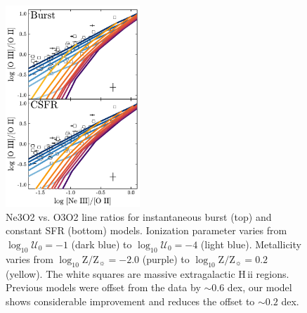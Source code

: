 \documentclass[linenumbers, trackchanges, tighten]{aastex61}%
\newcommand{\logten}{\ensuremath{\log_{10}}}
\newcommand{\hii}{H\,{\sc ii}\xspace}
\newcommand{\logZeq}[1]{\ensuremath{\logten \mathrm{Z}/\mathrm{Z}_{\sun} = #1}}
\newcommand{\logU}{\ensuremath{\logten \mathcal{U}_0}}
\begin{document}
\begin{figure}[!htbp]
  \begin{centering}
    \includegraphics[width=0.45\textwidth]{f20.pdf}
    \caption{Ne3O2 vs. O3O2 line ratios for instantaneous burst (top) and constant SFR (bottom) models. Ionization parameter varies from $\logU{}=-1$ (dark blue) to $\logU{}=-4$ (light blue). Metallicity varies from \logZeq{-2.0} (purple) to \logZeq{0.2} (yellow). The white squares are massive extragalactic \hii regions. Previous models were offset from the data by $\sim 0.6$ dex, our model shows considerable improvement and reduces the offset to $\sim 0.2$ dex.}
    \label{fig:NeIII}
  \end{centering}
\end{figure}
\end{document}
